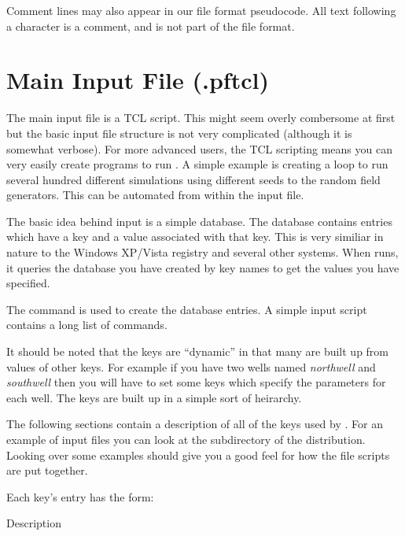 Comment lines may also appear in our file format pseudocode.
All text following a \code{#} character is a comment,
and is not part of the file format.


\section{Main Input File (.pftcl)}
\label{Main Input File (.pftcl)}

The main \parflow{} input file is a TCL script.  This might seem
overly combersome at first but the basic input file structure is not
very complicated (although it is somewhat verbose).  For more advanced
users, the TCL scripting means you can very easily create programs to
run \parflow{}.  A simple example is creating a loop to run several
hundred different simulations using different seeds to the random field
generators.  This can be automated from within the \parflow{} input file.

The basic idea behind \parflow{} input is a simple database.  The
database contains entries which have a key and a value associated with
that key.  This is very similiar in nature to the Windows XP/Vista
registry and several other systems.  When \parflow{} runs, it
queries the database you have created by key names to get the values
you have specified.

The command  is used to create the database entries.  A
simple \parflow{} input script contains a long list of
 commands.

It should be noted that the keys are ``dynamic'' in that many are
built up from values of other keys.  For example if you have two wells
named {\em northwell} and {\em southwell} then you will have to set some keys
which specify the parameters for each well.  The keys are built up in
a simple sort of heirarchy.

The following sections contain a description of all of the keys used by
\parflow{}.  For an example of input files you can look at the
 subdirectory of the \parflow{} distribution.  Looking
over some examples should give you a good feel for how the
file scripts are put together.

Each key's entry has the form:

{Description}{}

